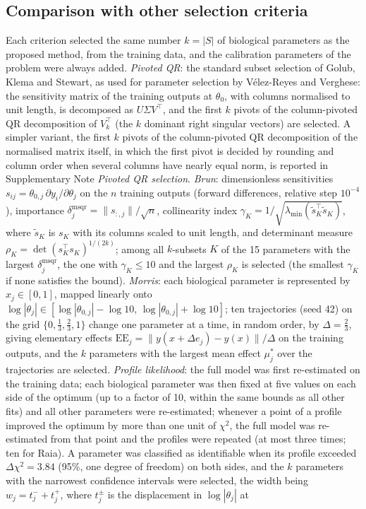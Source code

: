\documentclass[pdflatex,sn-nature]{sn-jnl}
\theoremstyle{plain}
\begin{document}
\subsection*{Comparison with other selection criteria}\label{met:comparison}

Each criterion selected the same number $k=|S|$ of biological parameters as the proposed method, from the training data, and the calibration parameters of the problem were always added. \emph{Pivoted QR}: the standard subset selection of Golub, Klema and Stewart\cite{bib57,bib54}, as used for parameter selection by V\'elez-Reyes and Verghese\cite{bib40}: the sensitivity matrix of the training outputs at $\theta_0$, with columns normalised to unit length, is decomposed as $U\Sigma V^{\top}$, and the first $k$ pivots of the column-pivoted QR decomposition of $V_k^{\top}$ (the $k$ dominant right singular vectors) are selected. A simpler variant, the first $k$ pivots of the column-pivoted QR decomposition of the normalised matrix itself, in which the first pivot is decided by rounding and column order when several columns have nearly equal norm, is reported in Supplementary Note \textit{Pivoted QR selection}. \emph{Brun}\cite{bib9}: dimensionless sensitivities $s_{ij}=\theta_{0,j}\,\partial y_i/\partial\theta_j$ on the $n$ training outputs (forward differences, relative step $10^{-4}$), importance $\delta^{\mathrm{msqr}}_j=\|s_{:,j}\|/\sqrt{n}$, collinearity index $\gamma_K=1/\sqrt{\lambda_{\min}(\tilde s_K^{\top}\tilde s_K)}$, where $\tilde s_K$ is $s_K$ with its columns scaled to unit length, and determinant measure $\rho_K=\det(s_K^{\top}s_K)^{1/(2k)}$; among all $k$-subsets $K$ of the 15 parameters with the largest $\delta^{\mathrm{msqr}}_j$, the one with $\gamma_K\le10$ and the largest $\rho_K$ is selected (the smallest $\gamma_K$ if none satisfies the bound). \emph{Morris}\cite{bib23}: each biological parameter is represented by $x_j\in[0,1]$, mapped linearly onto $\log|\theta_j|\in[\log|\theta_{0,j}|-\log10,\,\log|\theta_{0,j}|+\log10]$; ten trajectories (seed 42) on the grid $\{0,\frac13,\frac23,1\}$ change one parameter at a time, in random order, by $\Delta=\frac23$, giving elementary effects $\mathrm{EE}_j=\|y(x+\Delta e_j)-y(x)\|/\Delta$ on the training outputs, and the $k$ parameters with the largest mean effect $\mu^\ast_j$ over the trajectories are selected. \label{met:comp-pl}\emph{Profile likelihood}\cite{bib24,bib37}: the full model was first re-estimated on the training data; each biological parameter was then fixed at five values on each side of the optimum (up to a factor of 10, within the same bounds as all other fits) and all other parameters were re-estimated; whenever a point of a profile improved the optimum by more than one unit of $\chi^2$, the full model was re-estimated from that point and the profiles were repeated (at most three times; ten for Raia). A parameter was classified as identifiable when its profile exceeded $\Delta\chi^2=3.84$ (95\%, one degree of freedom) on both sides, and the $k$ parameters with the narrowest confidence intervals were selected, the width being $w_j=t_j^-+t_j^+$, where $t_j^\pm$ is the displacement in $\log|\theta_j|$ at 
\end{document}
